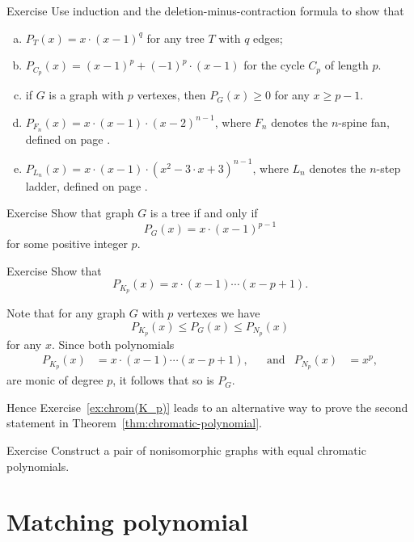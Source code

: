 \begin{thm}{Exercise}
Use induction and the deletion-minus-contraction formula to show that 
\begin{enumerate}[(a)]
\item $P_{T}(x)=x\cdot(x-1)^q$ for any tree $T$ with $q$ edges;
\item $P_{C_p}(x)=(x-1)^p+(-1)^p\cdot(x-1)$ for the cycle $C_p$ of length $p$.
\item if $G$ is a graph with $p$ vertexes, then $P_G(x)\ge 0$
for any $x\ge p-1$.
\item $P_{F_n}(x)=x\cdot(x-1)\cdot(x-2)^{n-1}$, where $F_n$ denotes the $n$-spine fan, defined on page \pageref{page:fan}.
\item $P_{L_n}(x)=x\cdot(x-1)\cdot(x^2-3\cdot x+3)^{n-1}$, where $L_n$ denotes the $n$-step ladder, defined on page \pageref{page:ladder}.
\end{enumerate}
\end{thm}


\begin{thm}{Exercise} Show that graph $G$ is a tree if and only if
\[P_G(x)= x\cdot(x-1)^{p-1}\]
for some positive integer $p$.
\end{thm}


\begin{thm}{Exercise}\label{ex:chrom(K_p)}
Show that 
\[P_{K_p}(x)=x\cdot(x-1)\cdots(x-p+1).\]

\end{thm}

Note that for any graph $G$ with $p$ vertexes we have
\[P_{K_p}(x)\le P_G(x)\le P_{N_p}(x)\]
for any $x$.
Since both polynomials
\begin{align*}
P_{K_p}(x)&=x\cdot(x-1)\cdots(x-p+1),&&
\text{and}
&
P_{N_p}(x)&=x^p,
\end{align*}
are monic of degree $p$,
it follows that so is $P_G$.

Hence Exercise~\ref{ex:chrom(K_p)} leads to an alternative way to prove the second statement in Theorem~\ref{thm:chromatic-polynomial}.

\begin{thm}{Exercise}
Construct a pair of nonisomorphic graphs with equal chromatic polynomials.
\end{thm}

\section*{Matching polynomial}

